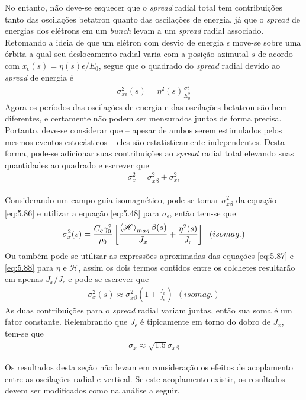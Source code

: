 No entanto, não deve-se esquecer que o \textit{spread} radial total tem contribuições tanto das oscilações betatron quanto das oscilações de energia, já que o \textit{spread} de energias dos elétrons em um \textit{bunch} levam a um \textit{spread} radial associado. Retomando a ideia de que um elétron com desvio de energia $\epsilon$ move-se sobre uma órbita a qual seu deslocamento radial varia com a posição azimutal $s$ de acordo com $x_\epsilon(s) = \eta(s) \epsilon/E_0$, segue que o quadrado do \textit{spread} radial devido ao \textit{spread} de energia é
\begin{align}
	\sigma_{x\epsilon}^2(s) = \eta^2(s)\frac{\sigma_\epsilon^2}{E_0^2}
\end{align}
Agora os períodos das oscilações de energia e das oscilações betatron são bem diferentes, e certamente não podem ser mensurados juntos de forma precisa. Portanto, deve-se considerar que -- apesar de ambos serem estimulados pelos mesmos eventos estocásticos -- eles são estatisticamente independentes. Desta forma, pode-se adicionar suas contribuições ao \textit{spread} radial total elevando suas quantidades ao quadrado e escrever que
\begin{align}
	\sigma_x^2 = \sigma_{x\beta}^2 + \sigma_{x\epsilon}^2
\end{align}

Considerando um campo guia isomagnético, pode-se tomar $\sigma_{x\beta}^2$ da equação \eqref{eq:5.86} e utilizar a equação \eqref{eq:5.48} para $\sigma_\epsilon$, então tem-se que
\begin{align}
	\sigma_x^2(s) = \frac{C_q \gamma_0^2}{\rho_0}\left[\frac{\left< \mathscr{H} \right>_{mag} \beta(s)}{J_x} + \frac{\eta^2(s)}{J_\epsilon}\right]\ \ (isomag.)
\end{align}
Ou também pode-se utilizar as expressões aproximadas das equações \eqref{eq:5.87} e \eqref{eq:5.88} para $\eta$ e $\mathscr{H}$, assim os dois termos contidos entre os colchetes resultarão em apenas $J_x/J_\epsilon$ e pode-se escrever que
\begin{align}
	\sigma_x^2(s) \approx \sigma_{x\beta}^2\left(1 + \frac{J_x}{J_\epsilon}\right)\ \ (isomag.)
\end{align}
As duas contribuições para o \textit{spread} radial variam juntas, então sua soma é um fator constante. Relembrando que $J_\epsilon$ é tipicamente em torno do dobro de $J_x$, tem-se que
\begin{align}
	\sigma_x \approx \sqrt{1.5}\sigma_{x\beta}
\end{align}

Os resultados desta seção não levam em consideração os efeitos de acoplamento entre as oscilações radial e vertical. Se este acoplamento existir, os resultados devem ser modificados como na análise a seguir.